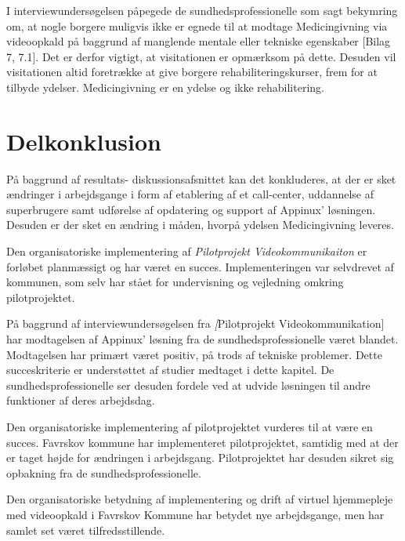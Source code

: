 I interviewundersøgelsen påpegede de sundhedsprofessionelle som sagt bekymring om, at nogle borgere muligvis ikke er egnede til at modtage Medicingivning via videoopkald på baggrund af manglende mentale eller tekniske egenskaber [Bilag 7, 7.1]. Det er derfor vigtigt, at visitationen er opmærksom på dette. Desuden vil visitationen altid foretrække at give borgere rehabiliteringskurser, frem for at tilbyde ydelser. Medicingivning er en ydelse og ikke rehabilitering.  

\section{Delkonklusion}
På baggrund af resultats- diskussionsafsnittet kan det konkluderes, at der er sket ændringer i arbejdsgange i form af etablering af et call-center, uddannelse af superbrugere samt udførelse af opdatering og support af Appinux' løsningen. Desuden er der sket en ændring i måden, hvorpå ydelsen Medicingivning leveres.

Den organisatoriske implementering af \textit{Pilotprojekt Videokommunikaiton} er forløbet planmæssigt og har været en succes. Implementeringen var selvdrevet af kommunen, som selv har stået for undervisning og vejledning omkring pilotprojektet.

På baggrund af interviewundersøgelsen fra \textit[Pilotprojekt Videokommunikation] har modtagelsen af Appinux' løsning fra de sundhedsprofessionelle været blandet. Modtagelsen har primært været positiv, på trods af tekniske problemer. Dette succeskriterie er understøttet af studier medtaget i dette kapitel. De sundhedsprofessionelle ser desuden fordele ved at udvide løsningen til andre funktioner af deres arbejdsdag. 

Den organisatoriske implementering af pilotprojektet vurderes til at være en succes. Favrskov kommune har implementeret pilotprojektet, samtidig med at der er taget højde for ændringen i arbejdsgang. Pilotprojektet har desuden sikret sig opbakning fra de sundhedsprofessionelle.

Den organisatoriske betydning af implementering og drift af virtuel hjemmepleje med videoopkald i Favrskov Kommune har betydet nye arbejdsgange, men har samlet set været tilfredsstillende.  